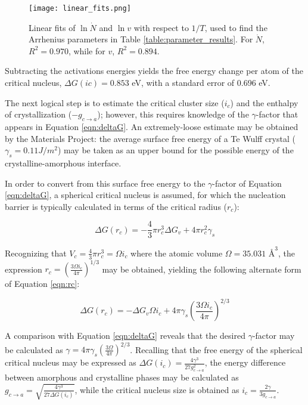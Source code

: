 	\begin{figure}[h]
		\centering
		\texttt{[image: linear\_fits.png]}
		\caption{Linear fits of $\ln{\dot{N}}$ and $\ln{v}$ with respect to $1/T$, used to find the Arrhenius parameters in Table \ref{table:parameter_results}.  For $\dot{N}$, $R^2 = 0.970$, while for $v$, $R^2 = 0.894$.}
		\label{fig:linear_fits}
	\end{figure}

Subtracting the activations energies yields the free energy change per atom of the critical nucleus, $\Delta G(ic) = 0.853$ eV, with a standard error of 0.696 eV.

The next logical step is to estimate the critical cluster size ($i_c$) and the enthalpy of crystallization ($-g_{c \rightarrow a}$); however, this requires knowledge of the $\gamma$-factor that appears in Equation \ref{eqn:deltaG}.  An extremely-loose estimate may be obtained by the Materials Project: the average surface free energy of a Te Wulff crystal ($\gamma_s = 0.11 J/m^2$) may be taken as an upper bound for the possible energy of the crystalline-amorphous interface.\cite{jain:2018}

In order to convert from this surface free energy to the $\gamma$-factor of Equation \ref{eqn:deltaG}, a spherical critical nucleus is assumed, for which the nucleation barrier is typically calculated in terms of the critical radius ($r_c$):

\begin{equation}
	\Delta G(r_c) = -\frac{4}{3}\pi r_c^3 \Delta G_v + 4 \pi r_c^2 \gamma_s
	\label{eqn:rc}
\end{equation}

Recognizing that $V_c = \frac{4}{3}\pi r_c^3 = \Omega i_c$ where the atomic volume $\Omega = 35.031$ $\si{\angstrom}^3$, the expression $r_c = \left( \frac{3\Omega i_c}{4\pi} \right)^{1/3}$ may be obtained, yielding the following alternate form of Equation \ref{eqn:rc}:

\begin{equation}
	\Delta G(r_c) = -\Delta G_v \Omega i_c + 4 \pi \gamma_s \left( \frac{3\Omega i_c}{4\pi} \right)^{2/3} 
	\label{eqn:rc_ic}
\end{equation}

A comparison with Equation \ref{eqn:deltaG} reveals that the desired $\gamma$-factor may be calculated as $\gamma = 4 \pi \gamma_s \left( \frac{3\Omega}{4\pi} \right)^{2/3}$.  Recalling that the free energy of the spherical critical nucleus may be expressed as $\Delta G(i_c) = \frac{4 \gamma^3}{27 g^2_{c \rightarrow a}}$, the energy difference between amorphous and crystalline phases may be calculated as $g_{c \rightarrow a} = \sqrt{\frac{4 \gamma^3}{27 \Delta G(i_c)}}$, while the critical nucleus size is obtained as $i_c = \frac{2 \gamma}{3 g_{c \rightarrow a}}$.

